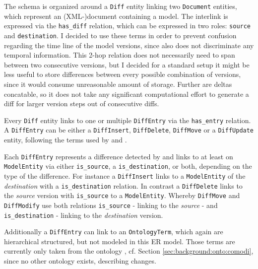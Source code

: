 
The schema is organized around a \texttt{Diff} entity linking two \texttt{Document} entities, which represent an (XML-)document containing a model. The interlink is expressed via the \texttt{has\_diff} relation, which can be expressed in two roles: \texttt{source} and \texttt{destination}. I decided to use these terms in order to prevent confusion regarding the time line of the model versions, since \bives also does not discriminate any temporal information.
This 2-hop relation does not necessarily need to span between two consecutive versions, but I decided for a standard setup it might be less useful to store differences between every possible combination of versions, since it would consume unreasonable amount of storage. Further are deltas concatable, so it does not take any significant computational effort to generate a diff for larger version steps out of consecutive diffs.

Every \texttt{Diff} entity links to one or multiple \texttt{DiffEntry} via the \texttt{has\_entry} relation.  
A \texttt{DiffEntry} can be either a \texttt{DiffInsert},  \texttt{DiffDelete}, \texttt{DiffMove} or a \texttt{DiffUpdate} entity, following the terms used by \bives \cite{Scharm2015} and \comodi \cite{Scharm2016}.

Each \texttt{DiffEntry} represents a difference detected by \bives \cite{Scharm2015} and links to at least on \texttt{ModelEntity} via either \texttt{is\_source}, a \texttt{is\_destination}, or both, depending on the type of the difference.
For instance a \texttt{DiffInsert} links to a \texttt{ModelEntity} of the \emph{destination} with a \texttt{is\_destination} relation.
In contrast a \texttt{DiffDelete} links to the \emph{source} version with \texttt{is\_source} to a \texttt{ModelEntity}. Whereby \texttt{DiffMove} and \texttt{DiffModify} use both relations \texttt{is\_source} - linking to the \emph{source} - and \texttt{is\_destination} - linking to the \emph{destination} version.

Additionally a \texttt{DiffEntry} can link to an \texttt{OntologyTerm}, which again are hierarchical structured, but not modeled in this ER model. Those terms are currently only taken from the \comodi ontology \cite{Scharm2016}, cf. Section \ref{sec:background:onto:comodi}, since no other ontology exists, describing changes.


